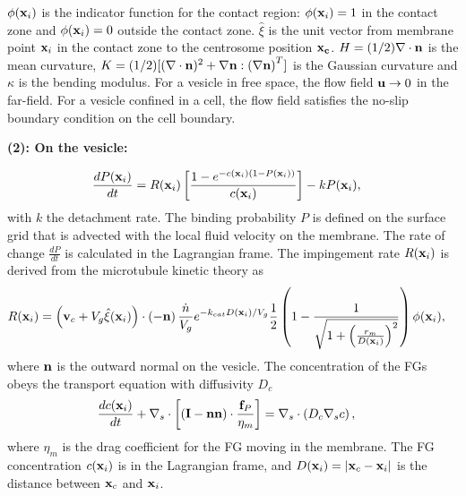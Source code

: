 \documentclass[11pt]{article}
\begin{document}
$\phi({\bf x}_i)$ is the indicator function for the contact region: $\phi({\bf x}_i)=1$ in the contact zone and $\phi({\bf x}_i)=0$ outside the contact zone.
$\hat\xi$ is the unit vector from membrane point ${\bf x}_i$ in the contact zone to the centrosome position ${\bf x_c}$.
$H=(1/2)\nabla\cdot{\bf n}$ is the mean curvature,
$K = (1/2) [ (\nabla\cdot{\bf n})^2+\nabla{\bf n}:\left(\nabla{\bf n}\right)^T]$ is the Gaussian curvature and $\kappa$ is the bending modulus.
For a vesicle in free space, the flow field ${\bf u}\rightarrow 0$ in the far-field. For a vesicle confined in a cell, the flow field satisfies the no-slip boundary condition on the cell boundary.

\noindent
{\bf (2): On the vesicle:}

\begin{align}
\frac{d P({\bf x}_i)}{d t} &= R({\bf x}_i)\left[\frac{1-e^{-c({\bf x}_i) (1-P({\bf x}_i))}}{c({\bf x}_i)}\right]- k P({\bf x}_i),
\end{align}
with $k$ the detachment rate. The binding probability $P$ is defined on the surface grid that is advected with the local fluid velocity on the membrane.
The rate of change $\frac{dP}{dt}$ is calculated in the Lagrangian frame. The impingement rate $R({\bf x}_i)$ is derived from the microtubule kinetic theory as
\begin{align}
R({\bf x}_i)&= \left({\bf v}_c  + V_g \hat {\bf \xi}({\bf x}_i)\right)\cdot \left(-{\bf n}\right) \frac{\dot n}{V_g} e^{-k_{cat} D({\bf x}_i)/V_g} \frac{1}{2}\left(1-\frac{1}{\sqrt{1+\left(\frac{r_m}{D({\bf x}_i)}\right)^2}}\right)\phi({\bf x}_i),
\end{align}
where ${\bf n}$ is the outward normal on the vesicle. 
The concentration of the FGs obeys the transport equation with diffusivity $D_c$
\begin{align}
\frac{dc({\bf x}_i)}{dt} + \nabla_s\cdot \left[ \left({\bf I}-{\bf n}{\bf n}\right)\cdot \frac{{\bf f}_{P}}{\eta_m}\right]  &= \nabla_s\cdot\left(D_c\nabla_s c\right),
\end{align}
where $\eta_m$ is the drag coefficient for the FG moving in the membrane. The FG concentration $c({\bf x}_i)$ is in the Lagrangian frame,  and
$D({\bf x}_i) = |{\bf x}_c - {\bf x}_i|$ is the distance between ${\bf x}_c$ and ${\bf x}_i$.
\end{document}
